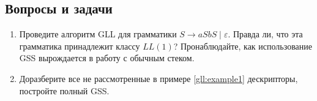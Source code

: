 \subsection{Вопросы и задачи}
\begin{enumerate}
  \item Проведите алгоритм GLL для грамматики $ S \to a S b S \mid \varepsilon$. Правда ли, что эта грамматика принадлежит классу $ LL(1) $? Пронаблюдайте, как использование GSS вырождается в работу с обычным стеком. 
  \item Доразберите все не рассмотренные в примере \ref{gll:example1} дескрипторы, постройте полный GSS.
\end{enumerate}

